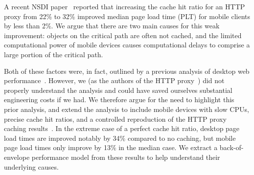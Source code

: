A recent NSDI paper~\cite{flywheel} reported that
increasing the cache hit ratio for an HTTP proxy from 22\% to 32\% improved
median page load time (PLT) for mobile clients by less than 2\%.
We argue that there are two main causes for this weak improvement:
objects on the critical path are often not cached, and the limited computational power of mobile devices causes computational delays to  comprise a large portion of the critical path. %




Both of
these factors were, in fact, outlined by a previous analysis of desktop
web performance~\cite{wang2013demystifying}.
However, we (as the authors of the HTTP proxy~\cite{flywheel}) did not properly understand the analysis and could have saved ourselves substantial engineering costs if we had. We therefore argue for the need to highlight this prior
analysis, and extend the analysis
to include mobile devices with slow CPUs, precise cache hit ratios,
and a controlled reproduction of the
HTTP proxy caching
results~\cite{flywheel}. %
In the extreme case of a perfect cache hit ratio, desktop page load times are
improved notably by 34\% compared to no caching, but mobile page
load times only improve by 13\% in the median case.
We extract a back-of-envelope performance model from these results to
help understand their underlying causes.



